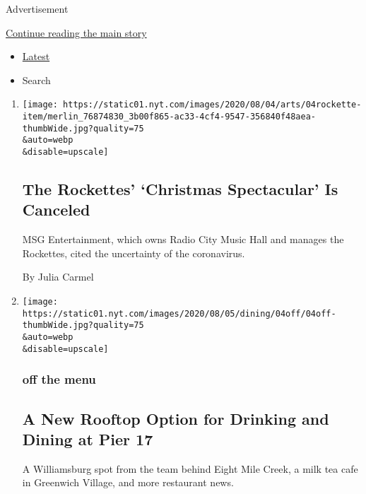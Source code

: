 Advertisement

\protect\hyperlink{after-mid1}{Continue reading the main story}

\begin{itemize}
\tightlist
\item
  \protect\hyperlink{stream-panel}{Latest}
\item
  Search
\end{itemize}

\begin{enumerate}
\def\labelenumi{\arabic{enumi}.}
\item
  \href{/2020/08/04/theater/radio-city-rockettes-christmas-canceled.html}{}

  \texttt{[image: https://static01.nyt.com/images/2020/08/04/arts/04rockette-item/merlin\_76874830\_3b00f865-ac33-4cf4-9547-356840f48aea-thumbWide.jpg?quality=75\\\&auto=webp\\\&disable=upscale]}

  \hypertarget{the-rockettes-christmas-spectacular-is-canceled}{%
  \subsection{The Rockettes' `Christmas Spectacular' Is
  Canceled}\label{the-rockettes-christmas-spectacular-is-canceled}}

  MSG Entertainment, which owns Radio City Music Hall and manages the
  Rockettes, cited the uncertainty of the coronavirus.

  By Julia Carmel
\item
  \href{/2020/08/04/dining/nyc-restaurant-news.html}{}

  \texttt{[image: https://static01.nyt.com/images/2020/08/05/dining/04off/04off-thumbWide.jpg?quality=75\\\&auto=webp\\\&disable=upscale]}

  \hypertarget{off-the-menu}{%
  \subsubsection{off the menu}\label{off-the-menu}}

  \hypertarget{a-new-rooftop-option-for-drinking-and-dining-at-pier-17}{%
  \subsection{A New Rooftop Option for Drinking and Dining at Pier
  17}\label{a-new-rooftop-option-for-drinking-and-dining-at-pier-17}}

  A Williamsburg spot from the team behind Eight Mile Creek, a milk tea
  cafe in Greenwich Village, and more restaurant news.


\end{enumerate}
